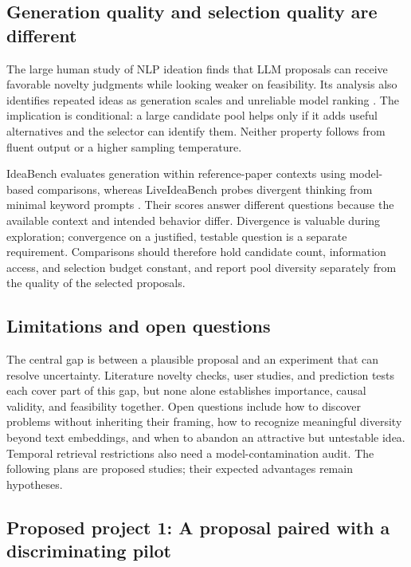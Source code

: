 \subsection{Generation quality and selection quality are different}

The large human study of NLP ideation finds that LLM proposals can receive favorable novelty judgments while looking weaker on feasibility. Its analysis also identifies repeated ideas as generation scales and unreliable model ranking \cite{llm-novel-research-ideas-human-study}. The implication is conditional: a large candidate pool helps only if it adds useful alternatives and the selector can identify them. Neither property follows from fluent output or a higher sampling temperature.

IdeaBench evaluates generation within reference-paper contexts using model-based comparisons, whereas LiveIdeaBench probes divergent thinking from minimal keyword prompts \cite{ideabench,liveideabench}. Their scores answer different questions because the available context and intended behavior differ. Divergence is valuable during exploration; convergence on a justified, testable question is a separate requirement. Comparisons should therefore hold candidate count, information access, and selection budget constant, and report pool diversity separately from the quality of the selected proposals.

\subsection{Limitations and open questions}

The central gap is between a plausible proposal and an experiment that can resolve uncertainty. Literature novelty checks, user studies, and prediction tests each cover part of this gap, but none alone establishes importance, causal validity, and feasibility together. Open questions include how to discover problems without inheriting their framing, how to recognize meaningful diversity beyond text embeddings, and when to abandon an attractive but untestable idea. Temporal retrieval restrictions also need a model-contamination audit. The following plans are proposed studies; their expected advantages remain hypotheses.

\subsection{Proposed project 1: A proposal paired with a discriminating pilot}

